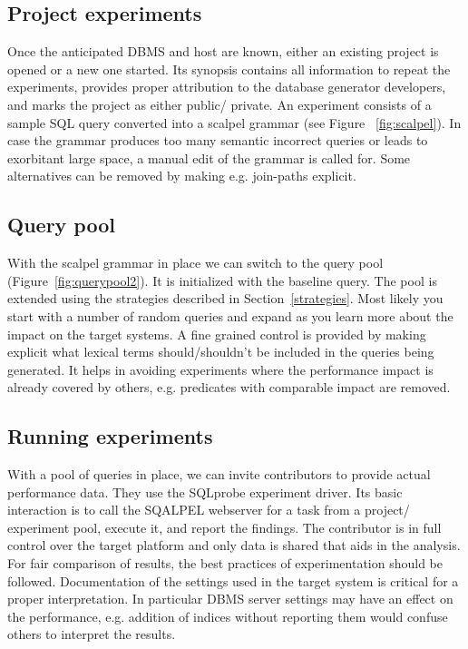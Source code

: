 \documentclass{cidr-2019}
\begin{document}
\subsection{Project experiments}
Once the anticipated DBMS and host are known, either an existing project is opened or a new one started. 
Its synopsis contains all information to repeat the experiments, provides
proper attribution to the database generator developers, and marks the project as either public/ private.
An experiment consists of a sample SQL query converted into
a scalpel grammar (see Figure ~\ref{fig:scalpel}). In case the grammar produces
too many semantic incorrect queries or leads to exorbitant large space, 
a manual edit of the grammar is called for. Some alternatives can be removed 
by making e.g. join-paths explicit. 

\subsection{Query pool}
With the scalpel grammar in place we can switch to the query pool (Figure~\ref{fig:querypool2}). It is initialized with the baseline query. 
The pool is extended using the strategies described in Section~\ref{strategies}.
Most likely you start with a number of random queries and expand as you learn more about the impact on the target systems. A fine grained control is provided by making explicit what
lexical terms should/shouldn't be included in the queries being generated. It helps in avoiding experiments where the performance impact is already covered by others, e.g. predicates with comparable impact are removed.


\subsection{Running experiments}
With a pool of queries in place, we can invite contributors to provide actual performance data.
They use the {\sc SQLprobe} experiment driver. 
Its basic interaction is to call the {\sc SQALPEL}
webserver for a task from a project/ experiment pool, execute it, and report the findings. 
The contributor is in full control over the target platform and only data is shared that aids in the analysis. 
For fair comparison of results, the best practices of experimentation should be followed. 
Documentation of the settings used in the target system is critical for a proper interpretation.
In particular DBMS server settings may have an effect on the performance, e.g.
addition of indices without reporting them would confuse others to interpret the results.
\end{document}

